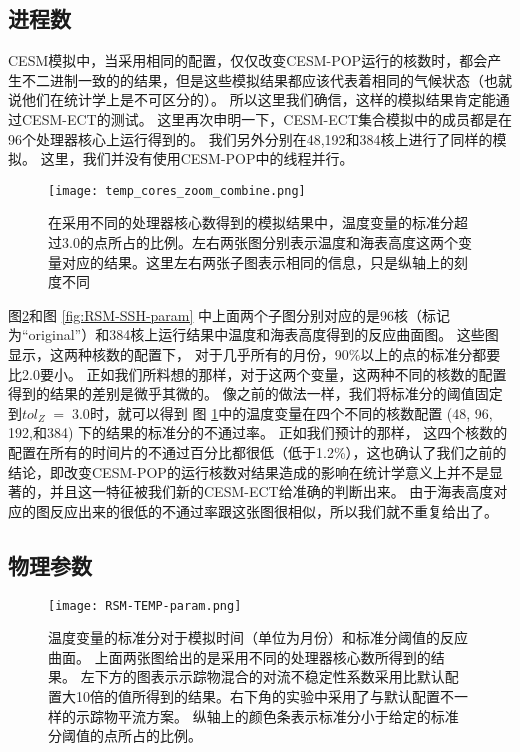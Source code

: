 \subsection{进程数}\label{verify:proc}

 
CESM模拟中，当采用相同的配置，仅仅改变CESM-POP运行的核数时，都会产生不二进制一致的的结果，但是这些模拟结果都应该代表着相同的气候状态（也就说他们在统计学上是不可区分的）。
所以这里我们确信，这样的模拟结果肯定能通过CESM-ECT的测试。 
这里再次申明一下，CESM-ECT集合模拟中的成员都是在96个处理器核心上运行得到的。
我们另外分别在48,192和384核上进行了同样的模拟。
这里，我们并没有使用CESM-POP中的线程并行。 


\begin{figure}
\centering
\texttt{[image: temp\_cores\_zoom\_combine.png]}
\caption{
在采用不同的处理器核心数得到的模拟结果中，温度变量的标准分超过3.0的点所占的比例。左右两张图分别表示温度和海表高度这两个变量对应的结果。这里左右两张子图表示相同的信息，只是纵轴上的刻度不同}
\label {fig:combine}
\end{figure}
 
图\ref{fig:RSM-TEMP-param}和图 \ref{fig:RSM-SSH-param} 中上面两个子图分别对应的是96核（标记为“original”）和384核上运行结果中温度和海表高度得到的反应曲面图。 
这些图显示，这两种核数的配置下， 对于几乎所有的月份，90\%以上的点的标准分都要比2.0要小。 
正如我们所料想的那样，对于这两个变量，这两种不同的核数的配置得到的结果的差别是微乎其微的。
像之前的做法一样，我们将标准分的阈值固定到$tol_{Z} \; = \; 3.0$时，就可以得到 图 \ref{fig:combine}中的温度变量在四个不同的核数配置 (48, 96, 192,和384) 下的结果的标准分的不通过率。
正如我们预计的那样， 这四个核数的配置在所有的时间片的不通过百分比都很低（低于1.2\%），这也确认了我们之前的结论，即改变CESM-POP的运行核数对结果造成的影响在统计学意义上并不是显著的，并且这一特征被我们新的CESM-ECT给准确的判断出来。 
由于海表高度对应的图反应出来的很低的不通过率跟这张图很相似，所以我们就不重复给出了。

 \subsection{物理参数}\label{verify:pp}

\begin {figure}[!ht]
\centering
\texttt{[image: RSM-TEMP-param.png]}
\caption {
温度变量的标准分对于模拟时间（单位为月份）和标准分阈值的反应曲面。
上面两张图给出的是采用不同的处理器核心数所得到的结果。
左下方的图表示示踪物混合的对流不稳定性系数采用比默认配置大10倍的值所得到的结果。右下角的实验中采用了与默认配置不一样的示踪物平流方案。
纵轴上的颜色条表示标准分小于给定的标准分阈值的点所占的比例。}
\label{fig:RSM-TEMP-param}
\end {figure}
 
